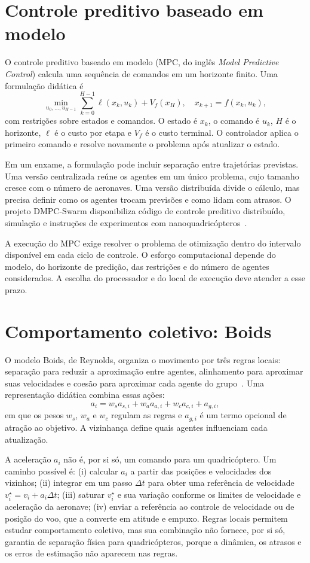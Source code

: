 \documentclass[11pt,a4paper,oneside]{book}
\numberwithin{equation}{chapter}
\begin{document}
\section{Controle preditivo baseado em modelo}
O controle preditivo baseado em modelo (MPC, do inglês \emph{Model Predictive Control}) calcula uma sequência de comandos em um horizonte finito. Uma formulação didática é
\begin{equation}
 \min_{u_0,\ldots,u_{H-1}}\sum_{k=0}^{H-1}\ell(x_k,u_k)+V_f(x_H),
 \quad x_{k+1}=f(x_k,u_k),
\end{equation}
com restrições sobre estados e comandos. O estado é $x_k$, o comando é $u_k$, $H$ é o horizonte, $\ell$ é o custo por etapa e $V_f$ é o custo terminal. O controlador aplica o primeiro comando e resolve novamente o problema após atualizar o estado.

Em um enxame, a formulação pode incluir separação entre trajetórias previstas. Uma versão centralizada reúne os agentes em um único problema, cujo tamanho cresce com o número de aeronaves. Uma versão distribuída divide o cálculo, mas precisa definir como os agentes trocam previsões e como lidam com atrasos. O projeto DMPC-Swarm disponibiliza código de controle preditivo distribuído, simulação e instruções de experimentos com nanoquadricópteros~\cite{dmpc}.

A execução do MPC exige resolver o problema de otimização dentro do intervalo disponível em cada ciclo de controle. O esforço computacional depende do modelo, do horizonte de predição, das restrições e do número de agentes considerados. A escolha do processador e do local de execução deve atender a esse prazo.

\section{Comportamento coletivo: Boids}
O modelo Boids, de Reynolds, organiza o movimento por três regras locais: separação para reduzir a aproximação entre agentes, alinhamento para aproximar suas velocidades e coesão para aproximar cada agente do grupo~\cite{boids}. Uma representação didática combina essas ações:
\begin{equation}
 a_i=w_s a_{s,i}+w_a a_{a,i}+w_c a_{c,i}+a_{g,i},
\end{equation}
em que os pesos $w_s$, $w_a$ e $w_c$ regulam as regras e $a_{g,i}$ é um termo opcional de atração ao objetivo. A vizinhança define quais agentes influenciam cada atualização.

A aceleração $a_i$ não é, por si só, um comando para um quadricóptero. Um caminho possível é: (i) calcular $a_i$ a partir das posições e velocidades dos vizinhos; (ii) integrar em um passo $\Delta t$ para obter uma referência de velocidade $v_i^\star=v_i+a_i\Delta t$; (iii) saturar $v_i^\star$ e sua variação conforme os limites de velocidade e aceleração da aeronave; (iv) enviar a referência ao controle de velocidade ou de posição do voo, que a converte em atitude e empuxo. Regras locais permitem estudar comportamento coletivo, mas sua combinação não fornece, por si só, garantia de separação física para quadricópteros, porque a dinâmica, os atrasos e os erros de estimação não aparecem nas regras.
\end{document}
